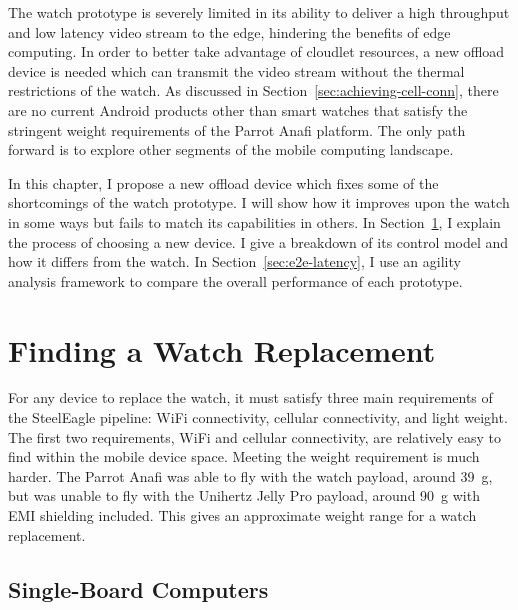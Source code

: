 The watch prototype is severely limited in its ability to deliver a high throughput and low latency video stream to the edge, hindering the benefits of edge computing. In order to better take advantage of cloudlet resources, a new offload device is needed which can transmit the video stream without the thermal restrictions of the watch. As discussed in Section~\ref{sec:achieving-cell-conn}, there are no current Android products other than smart watches that satisfy the stringent weight requirements of the Parrot Anafi platform. The only path forward is to explore other segments of the mobile computing landscape.

In this chapter, I propose a new offload device which fixes some of the shortcomings of the watch prototype. I will show how it improves upon the watch in some ways but fails to match its capabilities in others. In Section~\ref{sec:watch-replacement}, I explain the process of choosing a new device. I give a breakdown of its control model and how it differs from the watch. In Section~\ref{sec:e2e-latency}, I use an agility analysis framework to compare the overall performance of each prototype.

\section{Finding a Watch Replacement}
\label{sec:watch-replacement}

For any device to replace the watch, it must satisfy three main requirements of the SteelEagle pipeline: WiFi connectivity, cellular connectivity, and light weight. The first two requirements, WiFi and cellular connectivity, are relatively easy to find within the mobile device space. Meeting the weight requirement is much harder. The Parrot Anafi was able to fly with the watch payload, around 39~g, but was unable to fly with the Unihertz Jelly Pro payload, around 90~g with EMI shielding included. This gives an approximate weight range for a watch replacement.

\subsection{Single-Board Computers}

